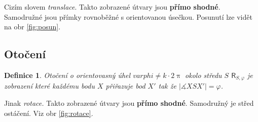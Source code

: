 \documentclass[12pt,a4wide,oneside,
headings]{report}
\newtheorem{defi}{Definice}[chapter]\theoremstyle{definition}
\begin{document}
Cizím slovem \emph{translace}. Takto zobrazené útvary jsou \textbf{přímo shodné}. Samodružné jsou přímky rovnoběžné s orientovanou úsečkou. Posunutí lze vidět na obr \ref{fig:posun}.

\subsection{Otočení}

\begin{defi}
Otočení o orientovasný úhel $varphi\neq k\cdot 2\uppi$ okolo středu $S$ $\mathsf{R}_{S,\varphi}$ je zobrazení které každému bodu $X$ přiřazuje bod $X'$ tak že $|\measuredangle  XSX'|=\varphi$.
\end{defi}

Jinak \emph{rotace.} Takto zobrazené útvary jsou \textbf{přímo shodné}. Samodružný je střed ostáčení. Viz obr \ref{fig:rotace}.
\end{document}
